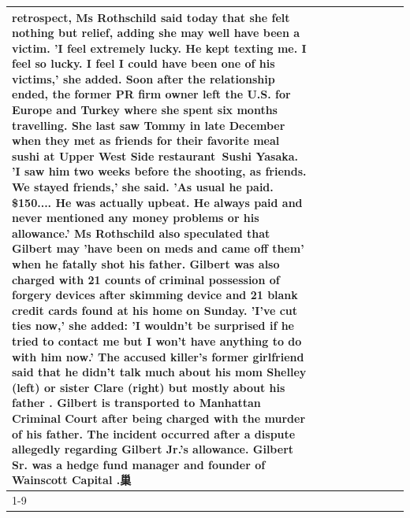 \begin{table}[H]
\begin{tabular}{lllrlllll}
retrospect, Ms Rothschild said today that she felt nothing but relief, adding she may well have been a victim. 'I feel extremely lucky. He kept texting me. I feel so lucky. I feel I could have been one of his victims,' she added. Soon after the relationship ended, the former PR firm owner left the U.S. for Europe and Turkey where she spent six months  travelling. She last saw Tommy in late December when they met as friends for their favorite meal sushi at Upper West Side restaurant Sushi Yasaka. 'I saw him two weeks before the shooting, as friends. We stayed friends,' she said. 'As usual he paid. \$150.... He was actually upbeat. He always paid and never mentioned any money problems or his allowance.' Ms Rothschild also speculated that Gilbert may 'have been on meds and came off them' when he fatally shot his father. Gilbert was also charged with 21 counts of criminal possession of forgery devices after skimming device and 21 blank credit cards found at his home on Sunday. 'I've cut ties now,' she added: 'I wouldn’t be surprised if he tried to contact me but I won’t have anything to do with him now.' The accused killer's former girlfriend said that he didn't talk much about his mom Shelley (left) or sister Clare (right) but mostly about his father . Gilbert is transported to Manhattan Criminal Court  after being charged with the murder of his father. The incident occurred after a dispute allegedly regarding Gilbert Jr.'s allowance. Gilbert Sr. was a hedge fund manager and founder of Wainscott Capital .巢 \\
\cline{1-9}

\end{tabular}
\end{table}
